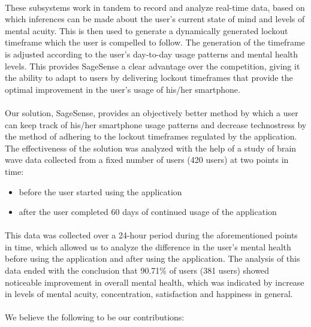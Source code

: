 \documentclass{article}
\begin{document}
\paragraph{} These subsystems work in tandem to record and analyze real-time data, based on which inferences can be made about the user's current state of mind and levels of mental acuity. This is then used to generate a dynamically generated lockout timeframe which the user is compelled to follow. The generation of the timeframe is adjusted according to the user's day-to-day usage patterns and mental health levels. This provides SageSense a clear advantage over the competition, giving it the ability to adapt to users by delivering lockout timeframes that provide the optimal improvement in the user's usage of his/her smartphone.

\paragraph{} Our solution, SageSense, provides an objectively better method by which a user can keep track of his/her smartphone usage patterns and decrease technostress by the method of adhering to the lockout timeframes regulated by the application. The effectiveness of the solution was analyzed with the help of a study of brain wave data collected from a fixed number of users (420 users) at two points in time:

\begin{itemize}
    \item before the user started using the application
    \item after the user completed 60 days of continued usage of the application
\end{itemize}

\paragraph{} This data was collected over a 24-hour period during the aforementioned points in time, which allowed us to analyze the difference in the user's mental health before using the application and after using the application. The analysis of this data ended with the conclusion that 90.71\% of users (381 users) showed noticeable improvement in overall mental health, which was indicated by increase in levels of mental acuity, concentration, satisfaction and happiness in general.

\paragraph{} We believe the following to be our contributions:
\end{document}
